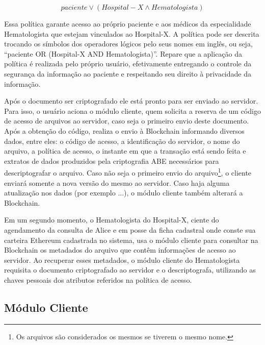 \documentclass[a4paper,11pt]{article}
\begin{document}
\[paciente \vee (Hospital-X \wedge Hematologista)\] %

Essa política garante acesso ao próprio paciente e aos médicos da especialidade Hematologista que estejam vinculados ao Hospital-X. A política pode ser descrita trocando os símbolos dos operadores lógicos pelo seus nomes em inglês, ou seja, ``paciente OR (Hospital-X AND Hematologista)''. %
Repare que a aplicação da política é realizada pelo próprio usuário, efetivamente entregando o controle da segurança da informação ao paciente e respeitando seu direito à privacidade da informação.

Após o documento ser criptografado ele está pronto para ser enviado ao servidor.
Para isso, o usuário aciona o módulo cliente, quem solicita a reserva de um código de acesso de arquivos ao servidor, caso seja o primeiro envio deste documento.
Após a obtenção do código, realiza o envio à Blockchain informando diversos dados, entre eles: o código de acesso, a identificação do servidor, o nome do arquivo, a política de acesso, o instante em que a transação está sendo feita e extratos de dados produzidos pela criptografia ABE necessários para descriptografar o arquivo.
Caso não seja o primeiro envio do arquivo\footnote{Os arquivos são considerados os mesmos se tiverem o mesmo nome.}, o cliente enviará somente a nova versão do mesmo ao servidor.
Caso haja alguma atualização nos dados ({\color{magenta}por exemplo ...}), o módulo cliente também alterará a Blockchain.

Em um segundo momento, o Hematologista do Hospital-X, ciente do agendamento da consulta de Alice e em posse da  ficha cadastral onde conste sua carteira Ethereum cadastrada no sistema, usa o módulo cliente para consultar na Blockchain os metadados do arquivo que contêm informações de acesso ao servidor. %
Ao recuperar esses metadados, o módulo cliente do Hematologista requisita o documento criptografado ao servidor e o descriptografa, utilizando as chaves pessoais dos atributos referidos na política de acesso.

\subsection{Módulo Cliente}
\end{document}
